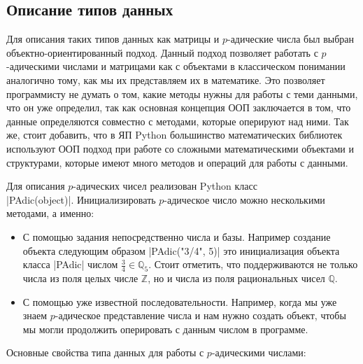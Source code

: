 \documentclass[master, och, diploma, times]{sty/SCWorks}
\theoremstyle{plain}
\theoremstyle{definition}
\begin{document}
\subsection{Описание типов данных}

Для описания таких типов данных как матрицы и $p$-адические числа был выбран объектно-ориентированный подход. Данный подход позволяет работать с $p$-адическими числами и матрицами как с объектами в классическом понимании аналогично тому, как мы их представляем их в математике. Это позволяет программисту не думать о том, какие методы нужны для работы с теми данными, что он уже определил, так как основная концепция ООП заключается в том, что данные определяются совместно с методами, которые оперируют над ними. Так же, стоит добавить, что в ЯП Python большинство математических библиотек используют ООП подход при работе со сложными математическими объектами и структурами, которые имеют много методов и операций для работы с данными.


Для описания $p$-адических чисел реализован Python класс \\ |PAdic(object)|. Инициализировать $p$-адическое число можно несколькими методами, а именно:


 \begin{itemize}
 \item С помощью задания непосредственно числа и базы. Например создание объекта следующим образом |PAdic("3/4", 5)| это инициализация объекта класса |PAdic| числом \mbox{$\frac{3}{4} \in \mathbb{Q}_5$}. Стоит отметить, что поддерживаются не \mbox{только} числа из поля целых числе $\mathbb{Z}$, но и числа из поля рациональных чисел $\mathbb{Q}$.
 \item С помощью уже известной последовательности. Например, когда мы уже знаем $p$-адическое представление числа и нам нужно создать объект, чтобы мы могли продолжить оперировать с данным числом в программе.
 \end{itemize}

\noindent Основные свойства типа данных для работы с $p$-адическими числами:
\end{document}

